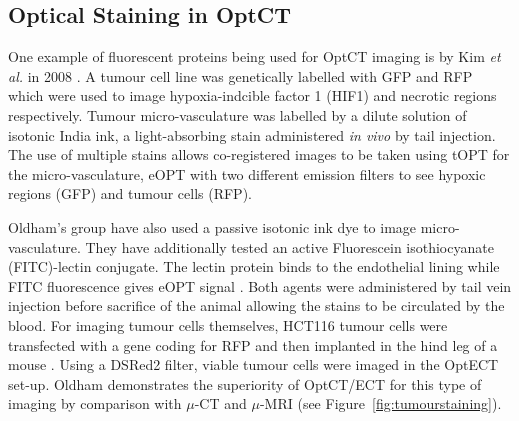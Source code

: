 \subsection{Optical Staining in OptCT}

One example of fluorescent proteins being used for OptCT imaging is by Kim \textit{et al.} in 2008 \cite{Kim:2008eua}. A tumour cell line was genetically labelled with GFP and RFP which were used to image hypoxia-indcible factor 1 (HIF1) and necrotic regions respectively. Tumour micro-vasculature was labelled by a dilute solution of isotonic India ink, a light-absorbing stain administered \textit{in vivo} by tail injection. The use of multiple stains allows co-registered images to be taken using tOPT for the micro-vasculature, eOPT with two different emission filters to see hypoxic regions (GFP) and tumour cells (RFP). 







Oldham's group have also used a passive isotonic ink dye to image micro-vasculature. They have additionally tested an active  Fluorescein isothiocyanate (FITC)-lectin conjugate. The lectin protein binds to the endothelial lining while FITC fluorescence gives eOPT signal \cite{Oldham:2007ku}. Both agents were administered by tail vein injection before sacrifice of the animal allowing the stains to be circulated by the blood.  For imaging tumour cells themselves, HCT116 tumour cells were transfected with a gene coding for RFP and then implanted in the hind leg of a mouse \cite{Oldham:2006}. Using a DSRed2 filter, viable tumour cells were imaged in the OptECT set-up. Oldham demonstrates the superiority of OptCT/ECT for this type of imaging by comparison with $\mu$-CT and $\mu$-MRI (see Figure~\ref{fig:tumourstaining}).



